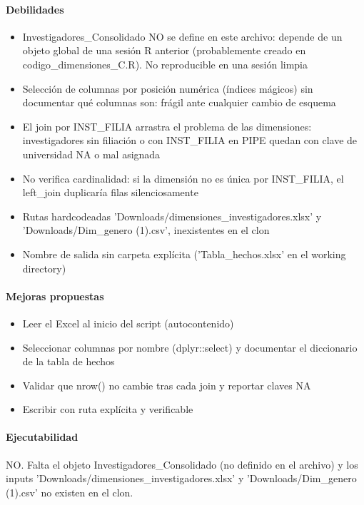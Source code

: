 \paragraph{Debilidades}
\begin{itemize}
  \item Investigadores\_Consolidado NO se define en este archivo: depende de un objeto global de una sesión R anterior (probablemente creado en codigo\_dimensiones\_C.R). No reproducible en una sesión limpia
  \item Selección de columnas por posición numérica (índices mágicos) sin documentar qué columnas son: frágil ante cualquier cambio de esquema
  \item El join por INST\_FILIA arrastra el problema de las dimensiones: investigadores sin filiación o con INST\_FILIA en PIPE quedan con clave de universidad NA o mal asignada
  \item No verifica cardinalidad: si la dimensión no es única por INST\_FILIA, el left\_join duplicaría filas silenciosamente
  \item Rutas hardcodeadas 'Downloads/dimensiones\_investigadores.xlsx' y 'Downloads/Dim\_genero (1).csv', inexistentes en el clon
  \item Nombre de salida sin carpeta explícita ('Tabla\_hechos.xlsx' en el working directory)
\end{itemize}

\paragraph{Mejoras propuestas}
\begin{itemize}
  \item Leer el Excel al inicio del script (autocontenido)
  \item Seleccionar columnas por nombre (dplyr::select) y documentar el diccionario de la tabla de hechos
  \item Validar que nrow() no cambie tras cada join y reportar claves NA
  \item Escribir con ruta explícita y verificable
\end{itemize}

\paragraph{Ejecutabilidad}
NO. Falta el objeto Investigadores\_Consolidado (no definido en el archivo) y los inputs 'Downloads/dimensiones\_investigadores.xlsx' y 'Downloads/Dim\_genero (1).csv' no existen en el clon.

